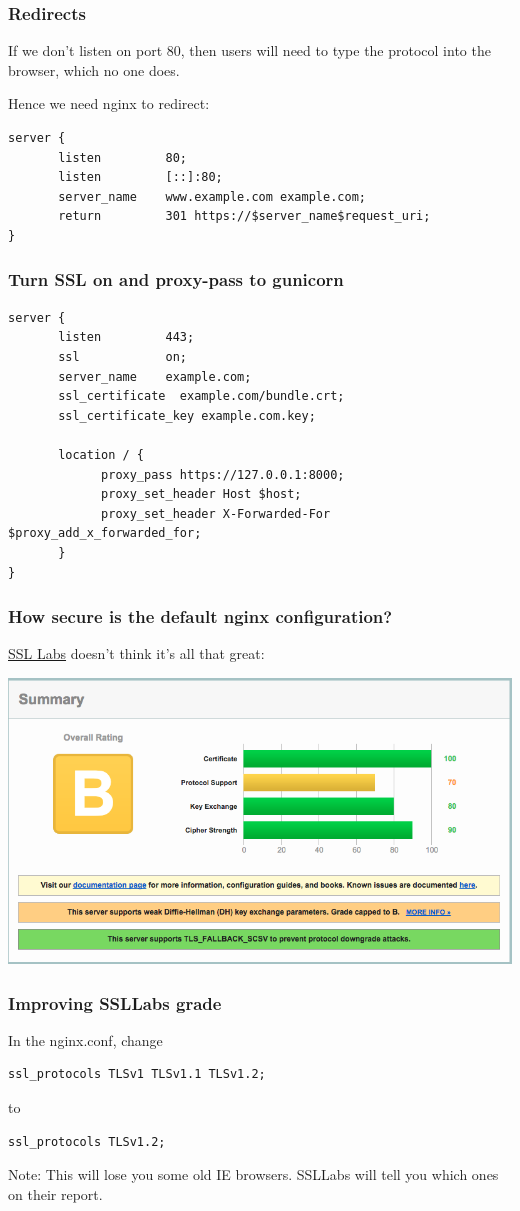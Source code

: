 \documentclass{beamer}
\begin{document}
\begin{frame}[fragile]
\frametitle{Redirects}
If we don't listen on port 80, then users will need to type the protocol into the browser, which no one does. 

Hence we need nginx to redirect:
\begin{verbatim}
server {
       listen         80;
       listen         [::]:80;
       server_name    www.example.com example.com;
       return         301 https://$server_name$request_uri;
}
\end{verbatim}
\end{frame}

\begin{frame}[fragile]
\frametitle{Turn SSL on and proxy-pass to gunicorn}
\begin{verbatim}
server {
       listen         443;
       ssl            on;
       server_name    example.com;
       ssl_certificate  example.com/bundle.crt;
       ssl_certificate_key example.com.key;

       location / {
             proxy_pass https://127.0.0.1:8000;
             proxy_set_header Host $host;
             proxy_set_header X-Forwarded-For $proxy_add_x_forwarded_for;
       }
}
\end{verbatim}
\end{frame}

\begin{frame}[fragile]
\frametitle{How secure is the default nginx configuration?}
\href{https://www.ssllabs.com/ssltest/analyze.html}{SSL Labs} doesn't think it's all that great:

\includegraphics[scale=0.25]{figures/SSLLabsFirstGrade.png}
\end{frame}

\begin{frame}[fragile]
\frametitle{Improving SSLLabs grade}
In the nginx.conf, change 
\begin{verbatim}
ssl_protocols TLSv1 TLSv1.1 TLSv1.2;
\end{verbatim}
to
\begin{verbatim}
ssl_protocols TLSv1.2;
\end{verbatim}
Note: This will lose you some old IE browsers. SSLLabs will tell you which ones on their report.
\end{frame}
\end{document}
